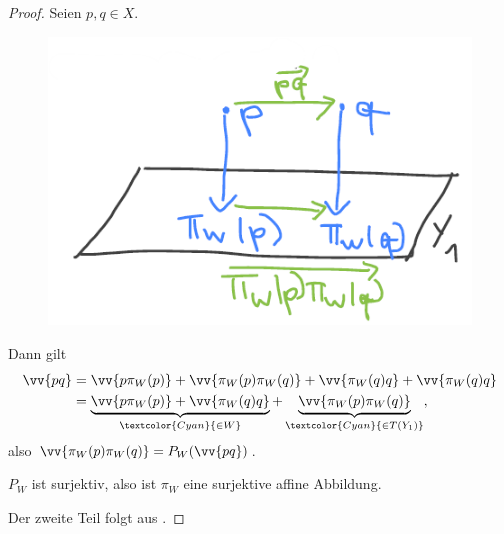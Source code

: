 \begin{proof}
    Seien \( p,q\in X \).
    \begin{figure}[H]
        \centering
        \includegraphics[width=0.5\linewidth]{figures/affine_projektion_ist_affin}
        \label{fig:affine_projektion_ist_affin}
    \end{figure}
    Dann gilt
    \begin{align*}
        \vv{pq}\begin{aligned}[t] 
            &=\vv{p\pi_W(p)}+\vv{\pi_W(p)\pi_W(q)}+\vv{\pi_W(q)q}+\vv{\pi_W(q)q}\\
            &=\underbrace{\vv{p\pi_W(p)}+\vv{\pi_W(q)q}}_{\textcolor{Cyan}{\in W}}+\underbrace{\vv{\pi_W(p)\pi_W(q)}}_{\textcolor{Cyan}{\in T(Y_1)}},
        \end{aligned}
    \end{align*}
    also \( \vv{\pi_W(p)\pi_W(q)}=P_W(\vv{pq}) \).

    \( P_W \) ist surjektiv, also ist \( \pi_W \) eine surjektive affine Abbildung.

    Der zweite Teil folgt aus .
\end{proof}